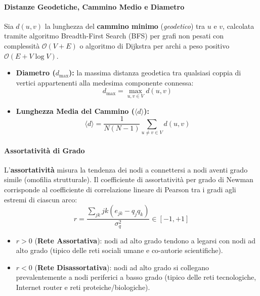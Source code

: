 \paragraph{Distanze Geodetiche, Cammino Medio e Diametro}
Sia $d(u, v)$ la lunghezza del \textbf{cammino minimo} (\textit{geodetico}) tra $u$ e $v$, calcolata tramite algoritmo Breadth-First Search (BFS) per grafi non pesati con complessità $\mathcal{O}(V + E)$ o algoritmo di Dijkstra per archi a peso positivo $\mathcal{O}(E + V \log V)$.
\begin{itemize}
    \item \textbf{Diametro ($d_{\max}$):} la massima distanza geodetica tra qualsiasi coppia di vertici appartenenti alla medesima componente connessa:
    \begin{equation}
        d_{\max} = \max_{u, v \in V} d(u, v)
    \end{equation}
    \item \textbf{Lunghezza Media del Cammino ($\langle d \rangle$):}
    \begin{equation}
        \langle d \rangle = \frac{1}{N(N-1)} \sum_{u \ne v \in V} d(u, v)
    \end{equation}
\end{itemize}

\paragraph{Assortatività di Grado}
L'\textbf{assortatività} misura la tendenza dei nodi a connettersi a nodi aventi grado simile (omofilia strutturale). Il coefficiente di assortatività per grado di Newman \cite{newman2003} corrisponde al coefficiente di correlazione lineare di Pearson tra i gradi agli estremi di ciascun arco:
\begin{equation}
    r = \frac{\sum_{jk} jk (e_{jk} - q_j q_k)}{\sigma_q^2} \in [-1, +1]
\end{equation}
\begin{itemize}
    \item $r > 0$ (\textbf{Rete Assortativa}): nodi ad alto grado tendono a legarsi con nodi ad alto grado (tipico delle reti sociali umane e co-autorie scientifiche).
    \item $r < 0$ (\textbf{Rete Disassortativa}): nodi ad alto grado si collegano prevalentemente a nodi periferici a basso grado (tipico delle reti tecnologiche, Internet router e reti proteiche/biologiche).
\end{itemize}

